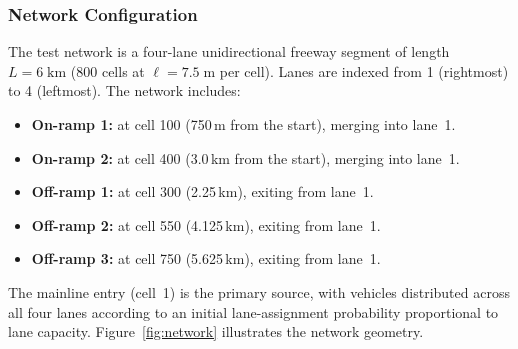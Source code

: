 \documentclass[review,number]{elsarticle}
\begin{document}
\subsubsection{Network Configuration}

The test network is a four-lane unidirectional freeway segment of length $L = 6\;\text{km}$ (800 cells at $\ell = 7.5\;\text{m}$ per cell). Lanes are indexed from 1 (rightmost) to 4 (leftmost). The network includes:
\begin{itemize}
    \item \textbf{On-ramp 1:} at cell 100 (750\,m from the start), merging into lane~1.
    \item \textbf{On-ramp 2:} at cell 400 (3.0\,km from the start), merging into lane~1.
    \item \textbf{Off-ramp 1:} at cell 300 (2.25\,km), exiting from lane~1.
    \item \textbf{Off-ramp 2:} at cell 550 (4.125\,km), exiting from lane~1.
    \item \textbf{Off-ramp 3:} at cell 750 (5.625\,km), exiting from lane~1.
\end{itemize}

The mainline entry (cell~1) is the primary source, with vehicles distributed across all four lanes according to an initial lane-assignment probability proportional to lane capacity. Figure~\ref{fig:network} illustrates the network geometry.
\end{document}
